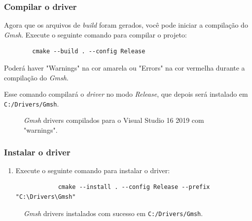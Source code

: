 \documentclass[a4paper,11pt]{article}
\newcommand{\gmsh}{\textit{Gmsh}}
\begin{document}
\subsubsection{Compilar o driver}

Agora que os arquivos de \textit{build} foram gerados, você pode iniciar a compilação do \gmsh{}. Execute o seguinte comando para compilar o projeto:
\begin{mdframed}
	\begin{verbatim}
		cmake --build . --config Release 
	\end{verbatim}
\end{mdframed}

Poderá haver "Warnings" na cor amarela ou "Errors" na cor vermelha durante a compilação do \gmsh{}.

Esse comando compilará o \textit{driver} no modo \textit{Release}, que depois será instalado em {\tt C:/Drivers/Gmsh}.

\begin{figure}[H]
	\centering
	\caption{\gmsh{} drivers compilados para o Visual Studio 16 2019 com "warnings".}
	\label{fig:gmsh_compile}
\end{figure}

\subsubsection{Instalar o driver}

\begin{enumerate}
	\item Execute o seguinte comando para instalar o driver:
	\begin{mdframed}
		\begin{verbatim}
			cmake --install . --config Release --prefix "C:\Drivers\Gmsh"
		\end{verbatim}
	\end{mdframed}
\end{enumerate}

\begin{figure}[H]
	\centering
	\caption{\gmsh{} drivers instalados com sucesso em {\tt C:/Drivers/Gmsh}.}
	\label{fig:gmsh_install}
\end{figure}
\end{document}
